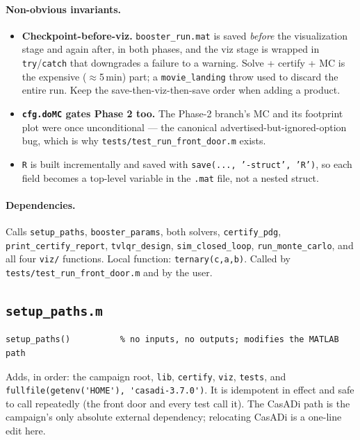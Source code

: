 \documentclass[11pt]{article}
\newcommand{\file}[1]{\texttt{#1}}
\begin{document}
\paragraph{Non-obvious invariants.}
\begin{itemize}
\item \textbf{Checkpoint-before-viz.} \texttt{booster\_run.mat} is saved
\emph{before} the visualization stage and again after, in both phases, and
the viz stage is wrapped in \texttt{try}/\texttt{catch} that downgrades a
failure to a warning. Solve + certify + MC is the expensive ($\approx$5\,min)
part; a \texttt{movie\_landing} throw used to discard the entire run. Keep
the save-then-viz-then-save order when adding a product.
\item \textbf{\texttt{cfg.doMC} gates Phase 2 too.} The Phase-2 branch's MC
and its footprint plot were once unconditional --- the canonical
advertised-but-ignored-option bug, which is why
\file{tests/test\_run\_front\_door.m} exists.
\item \texttt{R} is built incrementally and saved with
\texttt{save(..., '-struct', 'R')}, so each field becomes a top-level
variable in the \texttt{.mat} file, not a nested struct.
\end{itemize}

\paragraph{Dependencies.} Calls \texttt{setup\_paths}, \texttt{booster\_params},
both solvers, \texttt{certify\_pdg}, \texttt{print\_certify\_report},
\texttt{tvlqr\_design}, \texttt{sim\_closed\_loop}, \texttt{run\_monte\_carlo},
and all four \file{viz/} functions. Local function: \texttt{ternary(c,a,b)}.
Called by \file{tests/test\_run\_front\_door.m} and by the user.

\subsection{\texttt{setup\_paths.m}}

\begin{verbatim}
setup_paths()          % no inputs, no outputs; modifies the MATLAB path
\end{verbatim}

Adds, in order: the campaign root, \file{lib}, \file{certify}, \file{viz},
\file{tests}, and \verb|fullfile(getenv('HOME'), 'casadi-3.7.0')|. It is
idempotent in effect and safe to call repeatedly (the front door and every
test call it). The CasADi path is the campaign's only absolute external
dependency; relocating CasADi is a one-line edit here.
\end{document}

